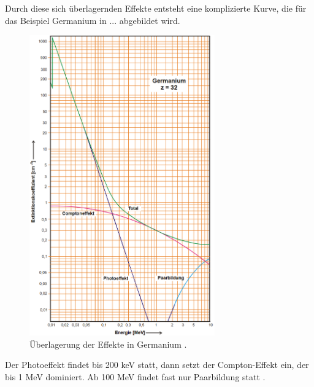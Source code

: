 Durch diese sich überlagernden Effekte entsteht eine komplizierte Kurve, die für das Beispiel Germanium in ... abgebildet wird. 
\begin{figure}[H]
    \centering
    \includegraphics[width = 8cm]{1}
    \caption{Überlagerung der Effekte in Germanium \cite{sample}.}
    \label{1}
  \end{figure}
Der Photoeffekt findet bis 200 keV statt, dann setzt der Compton-Effekt ein, der bis 1 MeV dominiert. Ab 100 MeV findet fast nur Paarbildung statt \cite{sample}. 


